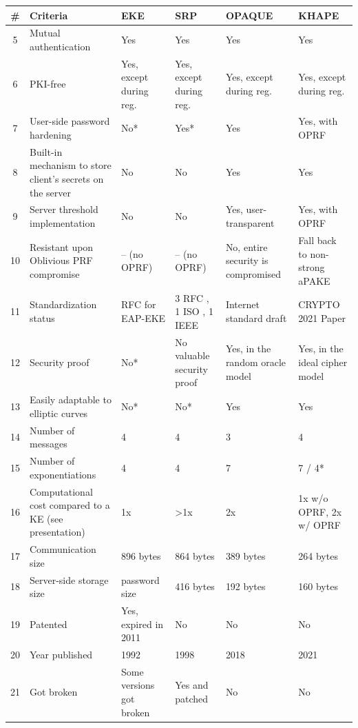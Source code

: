 ﻿\documentclass[../report.tex]{subfiles}
\begin{document}
\begin{center}
   \begin{tabular}{ | c | p{5cm} || p{2cm} | p{2cm} | p{2cm} | p{2cm} | }
     \hline
     \textbf{\#} & \textbf{Criteria} & \textbf{EKE} & \textbf{SRP} & \textbf{OPAQUE} & \textbf{KHAPE} \\ \hline
     5 & Mutual authentication & Yes & Yes & Yes & Yes \\ \hline
     6 & PKI-free & Yes, except during reg. & Yes, except during reg. & Yes, except during reg. & Yes, except during reg. \\ \hline
     7 & User-side password hardening & No* & Yes* & Yes & Yes, with OPRF \\ \hline
     8 & Built-in mechanism to store client's secrets on the server & No & No & Yes & Yes \\ \hline
     9 & Server threshold implementation & No & No & Yes, user-transparent & Yes, with OPRF \\ \hline
     10 & Resistant upon Oblivious PRF compromise & -- (no OPRF) & -- (no OPRF) & No, entire security is compromised & Fall back to non-strong aPAKE \\ \hline
     11 & Standardization status & RFC for EAP-EKE \cite{EAP_EKE_RFC} & 3 RFC \cite{SRP_RFC_1, SRP_RFC_2, SRP_RFC_3}, 1 ISO \cite{SRP_ISO}, 1 IEEE \cite{SRP_IEEE} & Internet standard draft \cite{OPAQUE_Standard_Draft} & CRYPTO 2021 Paper \cite{KHAPE_Paper} \\ \hline
     12 & Security proof & No* & No valuable security proof & Yes, in the random oracle model & Yes, in the ideal cipher model \\ \hline

     
     
     13 & Easily adaptable to elliptic curves & No* & No* & Yes & Yes \\ \hline
     14 & Number of messages & 4 & 4 & 3 & 4 \\ \hline
     15 & Number of exponentiations & 4 & 4 & 7 & 7 / 4* \\ \hline
     16 & Computational cost compared to a KE (see \cite{KHAPE_Paper} presentation) & 1x & >1x & 2x & 1x w/o OPRF, 2x w/ OPRF \\ \hline
     17 & Communication size & 896 bytes & 864 bytes & 389 bytes & 264 bytes \\ \hline
     18 & Server-side storage size & password size & 416 bytes & 192 bytes & 160 bytes \\ \hline
     
     19 & Patented & Yes, expired in 2011 & No & No & No \\ \hline
     20 & Year published & 1992 & 1998 & 2018 & 2021 \\ \hline
     21 & Got broken & Some versions got broken & Yes and patched \cite{CAA} & No & No \\ \hline
     \end{tabular}
 \end{center}
\end{document}
